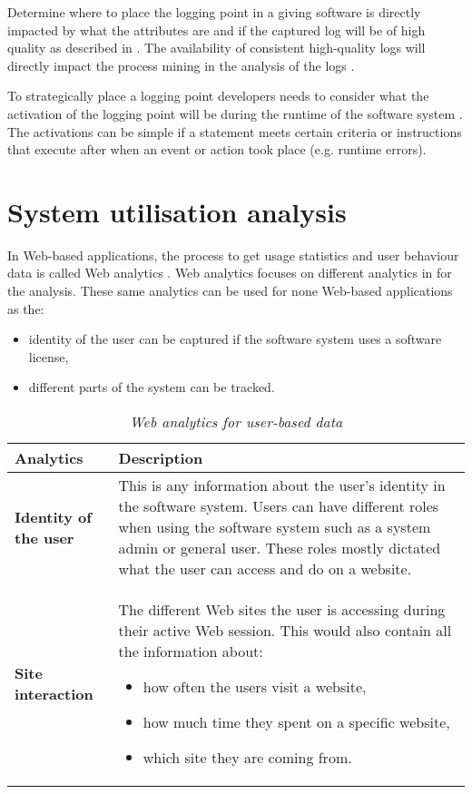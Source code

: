 Determine where to place the logging point in a giving software is directly impacted by what the attributes are and if the captured log will be of high quality as described in . The availability of consistent high-quality logs will directly impact the process mining in the analysis of the logs \cite{Kherbouche2017}.\par To strategically place a logging point developers needs to consider what the activation of the logging point will be during the runtime of the software system \cite{Pecchia2015, Cinque2013}. The activations can be simple if a statement meets certain criteria or instructions that execute after when an event or action took place (e.g. runtime errors).

\clearpage

\section{System utilisation analysis}\label{sec:ch1_systemUtilisation}
In Web-based applications, the process to get usage statistics and user behaviour data is called Web analytics \cite{Kocsis2012}. Web analytics focuses on different analytics in  for the analysis. These same analytics can be used for none Web-based applications as the: 

\begin{itemize}
	\item identity of the user can be captured if the software system uses a software license,
	\item different parts of the system can be tracked.
\end{itemize} 

\begin{table}[!htb]
	\centering
	\caption[Web analytics for user-based data]
	{\textit{Web analytics for user-based data}}
	\label{tbl:ch1_webAnalytics}
	\begin{tabularx}{\textwidth}{|l|X|}
		\hline \textbf{Analytics}  & \textbf{Description} \\
		\hline \textbf{Identity of the user} & This is any information about the user's identity in the software system. Users can have different roles when using the software system such as a system admin or general user. These roles mostly dictated what the user can access and do on a website. \\
		\hline \textbf{Site interaction} & The different Web sites the user is accessing during their active Web session. This would also contain all the information about: 
		\begin{itemize}
			\item how often the users visit a website,
			\item how much time they spent on a specific website,
			\item which site they are coming from.
		\end{itemize}
		\\
		\hline
	\end{tabularx}
\end{table}

